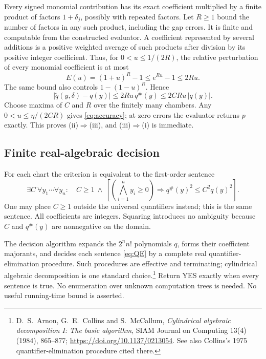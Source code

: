 \documentclass[11pt,a4paper]{article}
\theoremstyle{definition}
\theoremstyle{remark}
\newcommand{\abs}[1]{\lvert #1\rvert}
\newcommand{\maj}[1]{#1^{\#}}
\begin{document}
Every signed monomial contribution has its exact coefficient multiplied by a
finite product of factors $1+\delta_j$, possibly with repeated factors. Let
$R\ge1$ bound the number of factors in any such product, including the gap
errors. It is finite and computable from the constructed evaluator. A
coefficient represented by several additions is a positive weighted average
of such products after division by its positive integer coefficient. Thus,
for $0<u\le1/(2R)$, the relative perturbation of every monomial coefficient is
at most
\begin{equation}\label{eq:errorbound}
 E(u)=(1+u)^R-1\le e^{Ru}-1\le2Ru.
\end{equation}
The same bound also controls $1-(1-u)^R$. Hence
\begin{equation}\label{eq:forward}
 \abs{\widetilde q(y,\delta)-q(y)}
 \le 2Ru\,\maj q(y)
 \le 2CRu\,\abs{q(y)}.
\end{equation}
Choose maxima of $C$ and $R$ over the finitely many chambers. Any
$0<u\le\eta/(2CR)$ gives \eqref{eq:accuracy}; at zero errors the evaluator
returns $p$ exactly. This proves (ii)$\Rightarrow$(iii), and
(iii)$\Rightarrow$(i) is immediate.

\subsection{Finite real-algebraic decision}

For each chart the criterion is equivalent to the first-order sentence
\begin{equation}\label{eq:QE}
 \exists C\ \forall y_1\cdots\forall y_n:\quad
 C\ge1\ \wedge\
 \left[\left(\bigwedge_{i=1}^{n}y_i\ge0\right)
 \Longrightarrow \maj q(y)^2\le C^2q(y)^2\right].
\end{equation}
One may place $C\ge1$ outside the universal quantifiers instead; this is the
same sentence. All coefficients are integers. Squaring introduces no ambiguity
because $C$ and $\maj q(y)$ are nonnegative on the domain.

The decision algorithm expands the $2^n n!$ polynomials $q$, forms their
coefficient majorants, and decides each sentence \eqref{eq:QE} by a complete
real quantifier-elimination procedure. Such procedures are effective and
terminating; cylindrical algebraic decomposition is one standard
choice.\footnote{\label{fn:cad}D.~S.~Arnon, G.~E.~Collins and S.~McCallum,
\emph{Cylindrical algebraic decomposition I: The basic algorithm}, SIAM Journal
on Computing 13(4) (1984), 865--877;
\url{https://doi.org/10.1137/0213054}. See also Collins's 1975 quantifier-elimination
procedure cited there.}
Return YES exactly when every sentence is true. No enumeration over unknown
computation trees is needed. No useful running-time bound is asserted.
\end{document}
